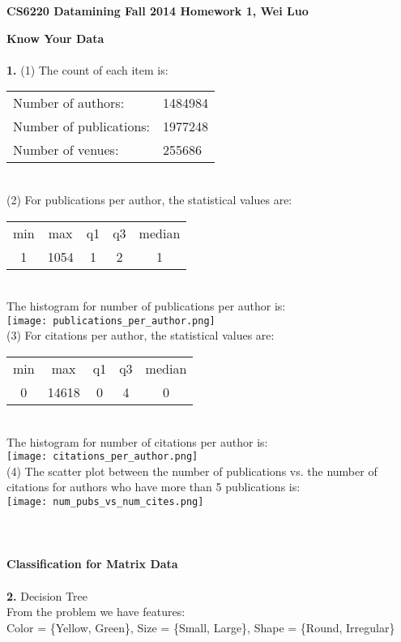 \documentclass[11pt,a4paper,fleqn]{article}
\begin{document}
\begin{center}
\textbf{CS6220 Datamining Fall 2014 Homework 1, Wei Luo}\\
\end{center}
\textbf{Know Your Data}\\ \\
\textbf{1.} (1) The count of each item is:\\
\begin{tabular}{ll} 
Number of authors: &1484984\\
Number of publications: &1977248\\
Number of venues: &255686\\
\end{tabular}\\
(2) For publications per author, the statistical values are:\\
\begin{tabular}{ccccc} 
min&max&q1&q3&median\\
1&1054&1&2&1\\
\end{tabular}\\
The histogram for number of publications per author is:\\
\texttt{[image: publications\_per\_author.png]}\\
(3) For citations per author, the statistical values are:\\
\begin{tabular}{ccccc} 
min&max&q1&q3&median\\
0&14618&0&4&0\\
\end{tabular}\\
The histogram for number of citations per author is:\\
\texttt{[image: citations\_per\_author.png]}\\
(4) The scatter plot between the number of publications vs. the number of citations for authors who have more than 5 publications is:\\
\texttt{[image: num\_pubs\_vs\_num\_cites.png]}\\
\\ \\ \\
\textbf{Classification for Matrix Data}\\ \\
\textbf{2.} Decision Tree\\
From the problem we have features:\\
Color = \{Yellow, Green\}, Size = \{Small, Large\}, Shape = \{Round, Irregular\}\\
\end{document}
